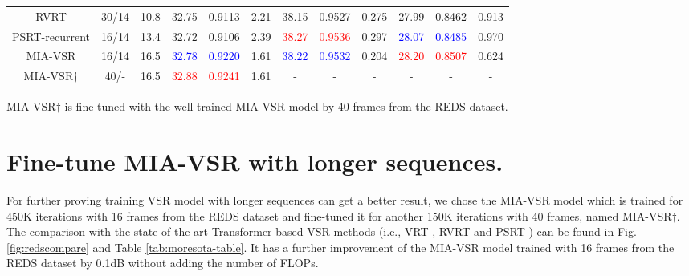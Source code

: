 \documentclass[10pt,twocolumn,letterpaper]{article}
\begin{document}
\begin{table*}[h]
\begin{threeparttable}
\begin{adjustbox}{center}
\begin{tabular}{c|c|c||ccc|ccc|ccc}
    RVRT \cite{liang2022recurrent}       & 30/14& 10.8 & 32.75 & 0.9113& 2.21& 38.15 & 0.9527& 0.275 & 27.99 & 0.8462&0.913 \\
    PSRT-recurrent \cite{shi2022rethinking} & 16/14& 13.4 & 32.72 & 0.9106&2.39 &\textcolor{red}{38.27} & \textcolor{red}{0.9536}&0.297&\textcolor{blue}{28.07}& \textcolor{blue}{0.8485}&0.970\\
    \rowcolor{gray!20}
    MIA-VSR& 16/14& 16.5 & \textcolor{blue}{32.78} & \textcolor{blue}{0.9220}&1.61 & \textcolor{blue}{38.22}& \textcolor{blue}{0.9532} &0.204& \textcolor{red}{28.20} & \textcolor{red}{0.8507}&0.624\\
    \rowcolor{gray!20}
    MIA-VSR$\dagger$& 40/-& 16.5 & \textcolor{red}{32.88} & \textcolor{red}{0.9241}&1.61 & -&-&-& -&-&-\\
    \bottomrule
    \end{tabular}
  \end{adjustbox}
    \begin{tablenotes} %
	\footnotesize \item MIA-VSR$\dagger$ is fine-tuned with the well-trained MIA-VSR model by 40 frames from the REDS \cite{nah2019ntire} dataset.
    \end{tablenotes}%
    \end{threeparttable}
\end{table*}
\section{Fine-tune MIA-VSR with longer sequences.} \label{c}
For further proving training VSR model with longer sequences can get a better result, we chose the MIA-VSR model which is trained for 450K iterations with 16 frames from the REDS \cite{nah2019ntire} dataset and fine-tuned it for another 150K iterations with 40 frames, named MIA-VSR$\dagger$. The comparison with the state-of-the-art Transformer-based VSR methods (i.e., VRT \cite{liang2022vrt}, RVRT \cite{liang2022recurrent} and PSRT \cite{shi2022rethinking}) can be found in Fig.\ref{fig:redscompare} and Table \ref{tab:moresota-table}. It has a further improvement of the MIA-VSR model trained with 16 frames from the REDS dataset by 0.1dB without adding the number of FLOPs. 
\end{document}
